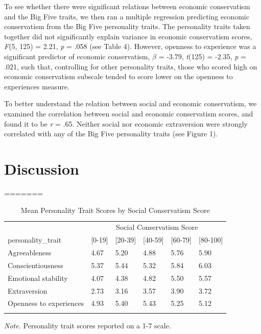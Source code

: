 \documentclass[man]{apa6}
\begin{document}
To see whether there were significant relations between economic
conservatism and the Big Five traits, we then ran a multiple regression
predicting economic conservatism from the Big Five personality traits.
The personality traits taken together did not significantly explain
variance in economic conservatism scores, \emph{F}(5, 125) = 2.21,
\emph{p} = .058 (see Table 4). However, openness to experience was a
significant predictor of economic conservatism, \(\beta\) = -3.79,
\emph{t}(125) = -2.35, \emph{p} = .021, such that, controlling for other
personality traits, those who scored high on economic conservatism
subscale tended to score lower on the openness to experiences measure.

To better understand the relation between social and economic
conservatism, we examined the correlation between social and economic
conservatism scores, and found it to be \emph{r} = .65. Neither social
nor economic extraversion were strongly correlated with any of the Big
Five personality traits (see Figure 1).

\section{Discussion}\label{discussion}
=======
\begin{table}[tbp]
\begin{center}
\begin{threeparttable}
\caption{\label{tab:table1}Mean Personality Trait Scores by Social Conservatism Score}
\begin{tabular}{llllll}
\toprule
 & \multicolumn{5}{c}{Social Conservatism Score} \\
\cmidrule(r){2-6}
personality\_trait & \multicolumn{1}{c}{[0-19]} & \multicolumn{1}{c}{[20-39]} & \multicolumn{1}{c}{[40-59]} & \multicolumn{1}{c}{[60-79]} & \multicolumn{1}{c}{[80-100]}\\
\midrule
Agreeableness & 4.67 & 5.20 & 4.88 & 5.76 & 5.90\\
Conscientiousness & 5.37 & 5.44 & 5.32 & 5.84 & 6.03\\
Emotional stability & 4.07 & 4.38 & 4.82 & 5.50 & 5.57\\
Extraversion & 2.73 & 3.16 & 3.57 & 3.90 & 3.72\\
Openness to experiences & 4.93 & 5.40 & 5.43 & 5.25 & 5.12\\
\bottomrule
\addlinespace
\end{tabular}
\begin{tablenotes}[para]
\normalsize{\textit{Note.} Personality trait scores reported on a 1-7 scale.}
\end{tablenotes}
\end{threeparttable}
\end{center}
\end{table}
\end{document}
